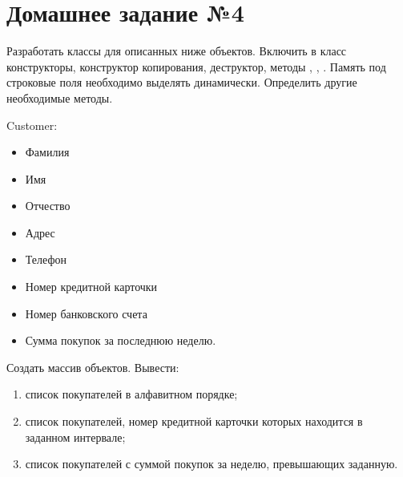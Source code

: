 \section*{Домашнее задание №4}

Разработать классы для описанных ниже объектов. Включить в класс
конструкторы, конструктор копирования, деструктор, методы ,
, . Память под строковые поля необходимо выделять
динамически. Определить другие необходимые методы.

Customer:
\begin{itemize}
	\item Фамилия
	\item Имя
	\item Отчество
	\item Адрес
	\item Телефон
	\item Номер кредитной карточки
	\item Номер банковского счета
	\item Сумма покупок за последнюю неделю.
\end{itemize}

Создать массив объектов. Вывести:
\begin{enumerate}
	\item список покупателей в алфавитном порядке;
	\item список покупателей, номер кредитной карточки которых находится в заданном интервале;
	\item список покупателей с суммой покупок за неделю, превышающих заданную.
\end{enumerate}
